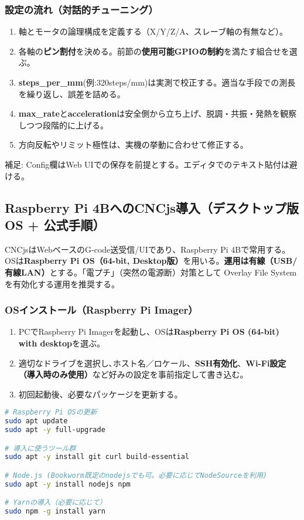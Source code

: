 \documentclass[uplatex,dvipdfmx]{ujarticle}
\begin{document}
\subsubsection*{設定の流れ（対話的チューニング）}
\begin{enumerate}
\item 軸とモータの論理構成を定義する（X/Y/Z/A、スレーブ軸の有無など）。
\item 各軸の\textbf{ピン割付}を決める。前節の\textbf{使用可能GPIOの制約}を満たす組合せを選ぶ。
\item \textbf{steps\_per\_mm}(例:320steps/mm)は実測で校正する。適当な手段での測長を繰り返し、誤差を詰める。
\item \textbf{max\_rate}と\textbf{acceleration}は安全側から立ち上げ、脱調・共振・発熱を観察しつつ段階的に上げる。
\item 方向反転やリミット極性は、実機の挙動に合わせて修正する。
\end{enumerate}

\noindent 補足: Config欄はWeb UIでの保存を前提とする。エディタでのテキスト貼付は避ける。
\subsection{Raspberry Pi 4BへのCNCjs導入（デスクトップ版OS + 公式手順）}

CNCjsはWebベースのG-code送受信/UIであり、Raspberry Pi 4Bで常用する。OSは\textbf{Raspberry Pi OS（64-bit, Desktop版）}を用いる。\textbf{運用は有線（USB/有線LAN）}とする。「電プチ」（突然の電源断）対策として Overlay File System を有効化する運用を推奨する。

\subsubsection*{OSインストール（Raspberry Pi Imager）}
\begin{enumerate}
\item PCでRaspberry Pi Imagerを起動し、OSは\textbf{Raspberry Pi OS (64-bit) with desktop}を選ぶ。
\item 適切なドライブを選択し､ホスト名／ロケール、\textbf{SSH有効化}、\textbf{Wi-Fi設定（導入時のみ使用）}など好みの設定を事前指定して書き込む。
\item 初回起動後、必要なパッケージを更新する。
\end{enumerate}

\begin{lstlisting}[caption=初期パッケージ導入（APT）, label=code:apt-init, language=bash]
# Raspberry Pi OSの更新
sudo apt update
sudo apt -y full-upgrade

# 導入に使うツール群
sudo apt -y install git curl build-essential

# Node.js (Bookworm既定のnodejsでも可。必要に応じてNodeSourceを利用)
sudo apt -y install nodejs npm

# Yarnの導入（必要に応じて）
sudo npm -g install yarn
\end{lstlisting}
\end{document}
